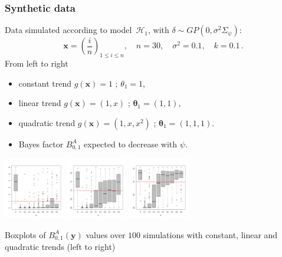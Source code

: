 \documentclass[nopagenumber,9pt]{beamer}
\newcommand{\bs}{\boldsymbol}
\newcommand{\bx}{\mathbf{x}}
\begin{document}
\begin{frame}
 \frametitle{Synthetic data}
  
  
  Data simulated according to model~$\mathcal{H}_1$, with $\delta\sim GP(0,\sigma^2\Sigma_\psi)$:
$$
\bs x = \left(\frac i n \right)_{1\leq i\leq n},\quad n=30,\quad\sigma^2=0.1,\quad k=0.1\,.
$$
From left to right
\begin{itemize}
\item constant trend $g(\bx)=1$ ; $\theta_1=1$, 
\item linear trend $g(\bx)=(1,x)$ ; $\bs{\theta}_1=(1,1)$,
\item quadratic trend $g(\bx)=(1,x,x^2)$ ; $\bs{\theta}_1=(1,1,1)$.
\end{itemize}
\begin{itemize}
\item Bayes factor $B_{0,1}^A$ expected to {{ decrease} with $\psi$}.
\end{itemize}

\begin{center}
\includegraphics[width=0.2\textwidth]{const_30_unif_prior.png}
\includegraphics[width=0.2\textwidth]{lin_30_unif_prior.png}
\includegraphics[width=0.2\textwidth]{poly_30_unif_prior.png}

Boxplots of $B_{0,1}^A(\bs y)$ values over $100$ simulations with constant, linear and quadratic trends (left to right)
\end{center}

% 


\end{frame}
\end{document}
